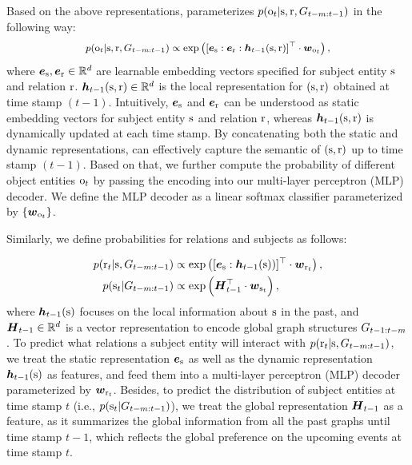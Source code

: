 Based on the above representations, \method parameterizes $p(\mathrm{o}_t| \allowbreak \mathrm{s},\mathrm{r},G_{t-m:t-1})$ in the following way:
\begin{equation}
\label{eq:prob}
	\small p( \mathrm{o}_{t}|\mathrm{s},\mathrm{r},G_{t-m:t-1}) \propto \exp \left([\boldsymbol{e}_{\mathrm{s}}:\boldsymbol{e}_{\mathrm{r}}:\boldsymbol{h}_{t-1}(\mathrm{s}, \mathrm{r})]^\top \cdot  \boldsymbol{w}_{\mathrm{o}_{t}}\right),
\end{equation}
where $\boldsymbol{e}_{\mathrm{s}}, \boldsymbol{e}_{\mathrm{r}} \in \mathbb{R}^d$ are learnable embedding vectors specified for subject entity $\mathrm{s}$ and relation $\mathrm{r}$. 
$\boldsymbol{h}_{t-1}(\mathrm{s},\mathrm{r})\in \mathbb{R}^d$ is the local representation for $(\mathrm{s},\mathrm{r})$ obtained at time stamp $(t-1)$. Intuitively, $\boldsymbol{e}_{\mathrm{s}}$ and $\boldsymbol{e}_{\mathrm{r}}$ can be understood as static embedding vectors for subject entity $\mathrm{s}$ and relation $\mathrm{r}$, whereas $\boldsymbol{h}_{t-1}(\mathrm{s},\mathrm{r})$ is dynamically updated at each time stamp. By concatenating both the static and dynamic representations, \method can effectively capture the semantic of $(\mathrm{s},\mathrm{r})$ up to time stamp $(t-1)$. Based on that, we further compute the probability of different object entities $\mathrm{o}_{t}$ by passing the encoding into our multi-layer perceptron (MLP) decoder.
We define the MLP decoder as a linear softmax classifier parameterized by $\{\boldsymbol{w}_{\mathrm{o}_{t}}\}$.



Similarly, we define probabilities for relations and subjects as follows:

\small
\begin{align}
\label{eq:prob2}
	p(\mathrm{r}_{t}|\mathrm{s},G_{t-m:t-1})&\propto \exp \left([\boldsymbol{e}_{\mathrm{s}}:\boldsymbol{h}_{t-1}(\mathrm{s}))]^\top \cdot \boldsymbol{w}_{\mathrm{r}_{t}} \right),\\
	\label{eq:prob3}
	p(\mathrm{s}_{t}|G_{t-m:t-1})& \propto \exp \left( \boldsymbol{H}_{t-1}^\top \cdot \boldsymbol{w}_{\mathrm{s}_{t}} \right),
\end{align}
\normalsize
where $\boldsymbol{h}_{t-1}(\mathrm{s})$ focuses on the local information about $\mathrm{s}$ in the past, and $\boldsymbol{H}_{t-1} \in \mathbb{R}^d$ is a vector representation to encode global graph structures $G_{t-1:t-m}$. To predict what relations a subject entity will interact with  $p(\mathrm{r}_{t}|\mathrm{s},G_{t-m:t-1})$, we treat the static representation $\boldsymbol{e}_{\mathrm{s}}$ as well as the dynamic representation $\boldsymbol{h}_{t-1}(\mathrm{s})$ as features, and feed them into a multi-layer perceptron (MLP) decoder parameterized by $\boldsymbol{w}_{\mathrm{r}_{t}}$. Besides, to predict the distribution of subject entities at time stamp $t$ (i.e., $p(\mathrm{s}_{t}|G_{t-m:t-1})$), we treat the global representation $\boldsymbol{H}_{t-1}$ as a feature, as it summarizes the global information from all the past graphs until time stamp $t-1$, which reflects the global preference on the upcoming events at time stamp $t$.

